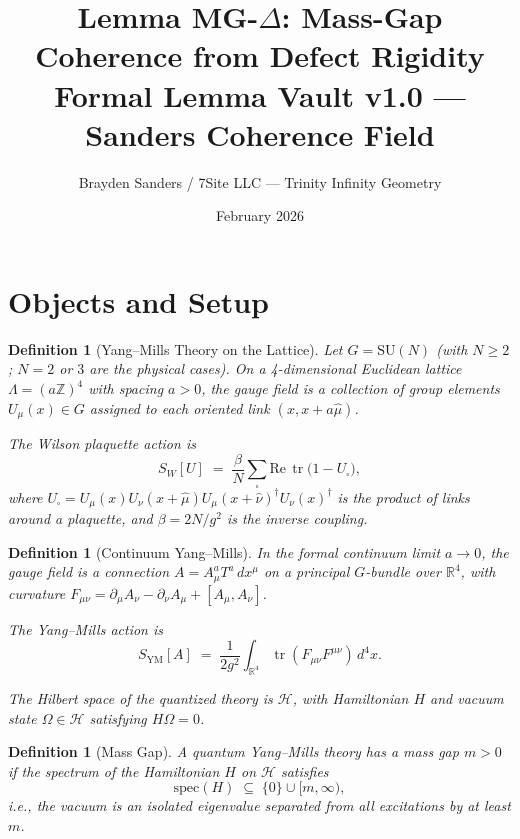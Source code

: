\documentclass[11pt]{article}
\title{%
  Lemma MG-$\Delta$: Mass-Gap Coherence from Defect Rigidity\\[4pt]
  \large Formal Lemma Vault v1.0 --- Sanders Coherence Field}
\author{Brayden Sanders / 7Site LLC --- Trinity Infinity Geometry}
\date{February 2026}
\newtheorem{definition}[lemma]{Definition}
\theoremstyle{definition}
\DeclareMathOperator{\tr}{tr}
\begin{document}
\maketitle

\section{Objects and Setup}

\begin{definition}[Yang--Mills Theory on the Lattice]
\label{def:ym-lattice}
Let $G = \mathrm{SU}(N)$ (with $N \geq 2$; $N = 2$ or $3$ are the physical cases).
On a 4-dimensional Euclidean lattice $\Lambda = (a\mathbb{Z})^4$ with spacing $a > 0$,
the gauge field is a collection of group elements $U_\mu(x) \in G$ assigned to each
oriented link $(x, x + a\hat{\mu})$.

The \emph{Wilson plaquette action} is
\[
  S_W[U] \;=\; \frac{\beta}{N} \sum_{\square} \mathrm{Re}\,\tr\bigl(1 - U_\square\bigr),
\]
where $U_\square = U_\mu(x) U_\nu(x+\hat{\mu}) U_\mu(x+\hat{\nu})^\dagger U_\nu(x)^\dagger$
is the product of links around a plaquette, and $\beta = 2N / g^2$ is the inverse coupling.
\end{definition}

\begin{definition}[Continuum Yang--Mills]
\label{def:ym-continuum}
In the formal continuum limit $a \to 0$, the gauge field is a connection
$A = A_\mu^a T^a \, dx^\mu$ on a principal $G$-bundle over $\mathbb{R}^4$,
with curvature $F_{\mu\nu} = \partial_\mu A_\nu - \partial_\nu A_\mu + [A_\mu, A_\nu]$.

The Yang--Mills action is
\[
  S_{\mathrm{YM}}[A] \;=\; \frac{1}{2g^2} \int_{\mathbb{R}^4} \tr(F_{\mu\nu} F^{\mu\nu})\, d^4x.
\]

The Hilbert space of the quantized theory is $\mathcal{H}$, with Hamiltonian $H$
and vacuum state $\Omega \in \mathcal{H}$ satisfying $H\Omega = 0$.
\end{definition}

\begin{definition}[Mass Gap]
\label{def:mass-gap}
A quantum Yang--Mills theory has a \emph{mass gap} $m > 0$ if
the spectrum of the Hamiltonian $H$ on $\mathcal{H}$ satisfies
\[
  \mathrm{spec}(H) \;\subseteq\; \{0\} \cup [m, \infty),
\]
i.e., the vacuum is an isolated eigenvalue separated from all excitations by at least $m$.
\end{definition}
\end{document}

